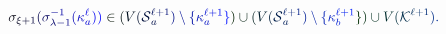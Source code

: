 \documentclass[12pt]{article}
\begin{document}
\makeatletter
\renewcommand*{\@textcolor}[3]{%
  \protect\leavevmode
  \begingroup
    \color#1{#2}#3%
  \endgroup
}
\makeatother
\begin{displaymath}
\mathcolor[RGB]{0,0,15}{\sigma} _ { \mathcolor[RGB]{0,0,30}{\xi} \mathcolor[RGB]{0,0,45}{+} \mathcolor[RGB]{0,0,60}{1} } \mathcolor[RGB]{0,0,75}{(} \mathcolor[RGB]{0,0,90}{\sigma} _ { \mathcolor[RGB]{0,0,105}{\lambda} \mathcolor[RGB]{0,0,120}{-} \mathcolor[RGB]{0,0,135}{1} } ^ { \mathcolor[RGB]{0,0,150}{-} \mathcolor[RGB]{0,0,165}{1} } \mathcolor[RGB]{0,0,180}{(} \mathcolor[RGB]{0,0,195}{\kappa} _ { \mathcolor[RGB]{0,0,210}{a} } ^ { \mathcolor[RGB]{0,0,225}{\ell} } \mathcolor[RGB]{0,0,240}{)} \mathcolor[RGB]{0,0,255}{)} \mathcolor[RGB]{0,15,0}{\in} \mathcolor[RGB]{0,15,15}{(} \mathcolor[RGB]{0,15,30}{V} \mathcolor[RGB]{0,15,45}{(} \mathcal { \mathcolor[RGB]{0,15,60}{S} } _ { \mathcolor[RGB]{0,15,75}{a} } ^ { \mathcolor[RGB]{0,15,90}{\ell} \mathcolor[RGB]{0,15,105}{+} \mathcolor[RGB]{0,15,120}{1} } \mathcolor[RGB]{0,15,135}{)} \mathcolor[RGB]{0,15,150}{\setminus} \mathcolor[RGB]{0,15,165}{\{} \mathcolor[RGB]{0,15,180}{\kappa} _ { \mathcolor[RGB]{0,15,195}{a} } ^ { \mathcolor[RGB]{0,15,210}{\ell} \mathcolor[RGB]{0,15,225}{+} \mathcolor[RGB]{0,15,240}{1} } \mathcolor[RGB]{0,15,255}{\}} \mathcolor[RGB]{0,30,0}{)} \mathcolor[RGB]{0,30,15}{\cup} \mathcolor[RGB]{0,30,30}{(} \mathcolor[RGB]{0,30,45}{V} \mathcolor[RGB]{0,30,60}{(} \mathcal { \mathcolor[RGB]{0,30,75}{S} } _ { \mathcolor[RGB]{0,30,90}{a} } ^ { \mathcolor[RGB]{0,30,105}{\ell} \mathcolor[RGB]{0,30,120}{+} \mathcolor[RGB]{0,30,135}{1} } \mathcolor[RGB]{0,30,150}{)} \mathcolor[RGB]{0,30,165}{\setminus} \mathcolor[RGB]{0,30,180}{\{} \mathcolor[RGB]{0,30,195}{\kappa} _ { \mathcolor[RGB]{0,30,210}{b} } ^ { \mathcolor[RGB]{0,30,225}{\ell} \mathcolor[RGB]{0,30,240}{+} \mathcolor[RGB]{0,30,255}{1} } \mathcolor[RGB]{0,45,0}{\}} \mathcolor[RGB]{0,45,15}{)} \mathcolor[RGB]{0,45,30}{\cup} \mathcolor[RGB]{0,45,45}{V} \mathcolor[RGB]{0,45,60}{(} \mathcal { \mathcolor[RGB]{0,45,75}{K} } ^ { \mathcolor[RGB]{0,45,90}{\ell} \mathcolor[RGB]{0,45,105}{+} \mathcolor[RGB]{0,45,120}{1} } \mathcolor[RGB]{0,45,135}{)} \mathcolor[RGB]{0,45,150}{.}
\end{displaymath}
\end{document}
